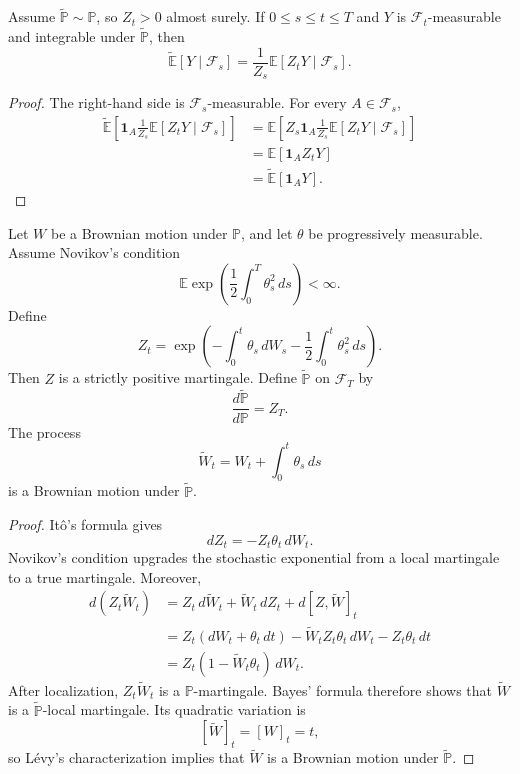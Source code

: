 \begin{thm}
Assume $\widetilde{\mathbb{P}}\sim\mathbb{P}$, so $Z_t>0$ almost surely. If $0\leq s\leq t\leq T$ and $Y$ is $\mathcal{F}_t$-measurable and integrable under $\widetilde{\mathbb{P}}$, then
\[
\widetilde{\mathbb{E}}[Y\mid\mathcal{F}_s]
=
\frac{1}{Z_s}
\mathbb{E}[Z_tY\mid\mathcal{F}_s].
\]
\end{thm}

\begin{proof}
The right-hand side is $\mathcal{F}_s$-measurable. For every $A\in\mathcal{F}_s$,
\[
\begin{aligned}
\widetilde{\mathbb{E}}\left[
\mathbf{1}_A
\frac{1}{Z_s}\mathbb{E}[Z_tY\mid\mathcal{F}_s]
\right]
&=
\mathbb{E}\left[
Z_s\mathbf{1}_A
\frac{1}{Z_s}\mathbb{E}[Z_tY\mid\mathcal{F}_s]
\right]\\
&=
\mathbb{E}[\mathbf{1}_AZ_tY]\\
&=
\widetilde{\mathbb{E}}[\mathbf{1}_AY].
\end{aligned}
\]
\end{proof}

\begin{thm}
Let $W$ be a Brownian motion under $\mathbb{P}$, and let $\theta$ be progressively measurable. Assume Novikov's condition
\[
\mathbb{E}\exp\left(
\frac12\int_0^T\theta_s^2\,ds
\right)<\infty.
\]
Define
\[
Z_t
=
\exp\left(
-\int_0^t\theta_s\,dW_s
-\frac12\int_0^t\theta_s^2\,ds
\right).
\]
Then $Z$ is a strictly positive martingale. Define $\widetilde{\mathbb{P}}$ on $\mathcal{F}_T$ by
\[
\frac{d\widetilde{\mathbb{P}}}{d\mathbb{P}}=Z_T.
\]
The process
\[
\widetilde W_t
=W_t+\int_0^t\theta_s\,ds
\]
is a Brownian motion under $\widetilde{\mathbb{P}}$.
\end{thm}

\begin{proof}
It\^o's formula gives
\[
dZ_t=-Z_t\theta_t\,dW_t.
\]
Novikov's condition upgrades the stochastic exponential from a local martingale to a true martingale. Moreover,
\[
\begin{aligned}
d(Z_t\widetilde W_t)
&=Z_t\,d\widetilde W_t+
\widetilde W_t\,dZ_t+d[Z,\widetilde W]_t\\
&=Z_t(dW_t+\theta_t\,dt)
-\widetilde W_tZ_t\theta_t\,dW_t
-Z_t\theta_t\,dt\\
&=Z_t(1-\widetilde W_t\theta_t)\,dW_t.
\end{aligned}
\]
After localization, $Z_t\widetilde W_t$ is a $\mathbb{P}$-martingale. Bayes' formula therefore shows that $\widetilde W$ is a $\widetilde{\mathbb{P}}$-local martingale. Its quadratic variation is
\[
[\widetilde W]_t=[W]_t=t,
\]
so L\'evy's characterization implies that $\widetilde W$ is a Brownian motion under $\widetilde{\mathbb{P}}$.
\end{proof}

